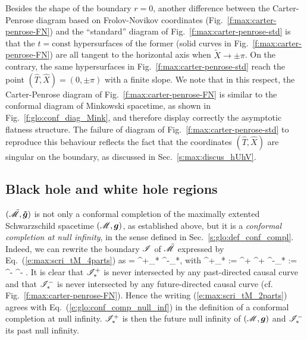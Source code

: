 Besides the shape of the boundary $r=0$, another difference between
the Carter-Penrose diagram based on Frolov-Novikov coordinates
(Fig.~\ref{f:max:carter-penrose-FN}) and the ``standard'' diagram
of Fig.~\ref{f:max:carter-penrose-std} is that the $t=\mathrm{const}$
hypersurfaces of the former (solid curves in Fig.~\ref{f:max:carter-penrose-FN})
are all tangent to the horizontal axis when $\tilde{X}\rightarrow \pm\pi$.
On the contrary, the same hypersurfaces in Fig.~\ref{f:max:carter-penrose-std}
reach the point $(\hat{T},\hat{X}) = (0,\pm\pi)$ with a finite slope.
We note that in this respect, the Carter-Penrose diagram of
Fig.~\ref{f:max:carter-penrose-FN} is similar to the conformal diagram of
Minkowski spacetime, as shown in Fig.~\ref{f:glo:conf_diag_Mink}, and
therefore display correctly the asymptotic flatness structure.
The failure of diagram of Fig.~\ref{f:max:carter-penrose-std} to reproduce
this behaviour reflects the fact that the coordinates $(\hat{T},\hat{X})$ are singular on the
boundary, as discussed in Sec.~\ref{s:max:discus_hUhV}.


\subsection{Black hole and white hole regions} \label{s:max:black_white}

$(\tilde{\mathscr{M}},\bm{\tilde{g}})$ is not only a conformal
completion of the maximally extented Schwarzschild spacetime $(\mathscr{M},\bm{g})$,
as established above, but it is a \emph{conformal completion at null infinity}, in the sense defined in Sec.~\ref{s:glo:def_conf_compl}.
Indeed, we can rewrite the boundary $\mathscr{I}$
of $\tilde{\mathscr{M}}$ expressed by Eq.~(\ref{e:max:scri_tM_4parts}) as
\be \label{e:max:scri_tM_2parts}
    \scri = \scri^+_* \cup \scri^-_*,
\ee
with
\be
    \scri^+_* := \scri^+ ^+ \qand
    \scri^-_* := \scri^- ^- .
\ee
It is clear that $\mathscr{I}^+_*$ is never intersected by any past-directed causal curve
and that $\mathscr{I}^-_*$ is never intersected by any future-directed causal curve
(cf. Fig.~\ref{f:max:carter-penrose-FN}). Hence the writing (\ref{e:max:scri_tM_2parts})
agrees with Eq.~(\ref{e:glo:conf_comp_null_inf}) in the definition of a conformal
completion at null infinity. $\mathscr{I}^+_*$ is then the future null infinity
of $(\mathscr{M}, \bm{g})$ and $\mathscr{I}^-_*$ its past null infinity.

